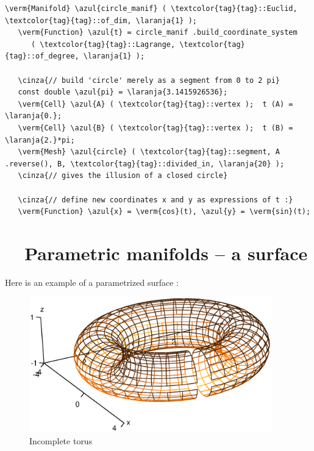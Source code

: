 \begin{Verbatim}[commandchars=\\\{\},formatcom=\small\tt,baselinestretch=0.94]
   \verm{Manifold} \azul{circle_manif} ( \textcolor{tag}{tag}::Euclid, \textcolor{tag}{tag}::of_dim, \laranja{1} );
   \verm{Function} \azul{t} = circle_manif .build_coordinate_system
      ( \textcolor{tag}{tag}::Lagrange, \textcolor{tag}{tag}::of_degree, \laranja{1} );

   \cinza{// build 'circle' merely as a segment from 0 to 2 pi}
   const double \azul{pi} = \laranja{3.1415926536};
   \verm{Cell} \azul{A} ( \textcolor{tag}{tag}::vertex );  t (A) = \laranja{0.};
   \verm{Cell} \azul{B} ( \textcolor{tag}{tag}::vertex );  t (B) = \laranja{2.}*pi;
   \verm{Mesh} \azul{circle} ( \textcolor{tag}{tag}::segment, A .reverse(), B, \textcolor{tag}{tag}::divided_in, \laranja{20} );
   \cinza{// gives the illusion of a closed circle}

   \cinza{// define new coordinates x and y as expressions of t :}
   \verm{Function} \azul{x} = \verm{cos}(t), \azul{y} = \verm{sin}(t);
\end{Verbatim}


\section{~~Parametric manifolds -- a surface}\label{\numb section 2.\numb parag 19}

Here is an example of a parametrized surface :

\begin{figure}[ht] \centering
  \includegraphics[width=105mm]{torus}
  \caption{Incomplete torus}
  \label{\numb section 2.\numb fig 20}
\end{figure}


